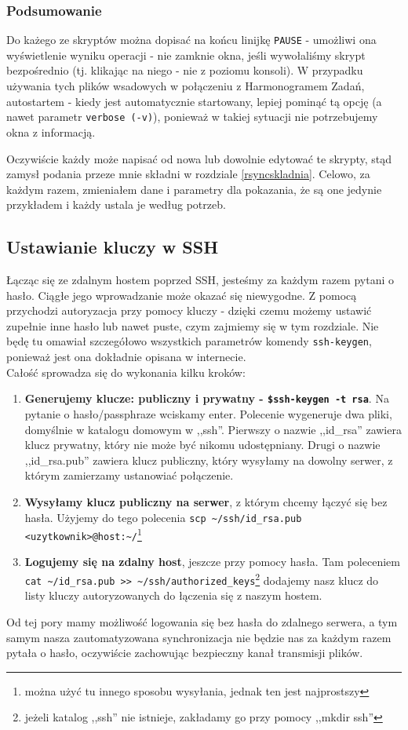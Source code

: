\subsubsection{Podsumowanie}
Do każego ze skryptów można dopisać na końcu linijkę \verb|PAUSE| - umożliwi ona wyświetlenie wyniku operacji - nie zamknie okna, jeśli wywołaliśmy skrypt bezpośrednio (tj. klikając na niego - nie z poziomu konsoli). W przypadku używania tych plików wsadowych w połączeniu z Harmonogramem Zadań, autostartem - kiedy jest automatycznie startowany, lepiej pominąć tą opcję (a nawet parametr \verb|verbose (-v)|), ponieważ w takiej sytuacji nie potrzebujemy okna z informacją. 

Oczywiście każdy może napisać od nowa lub dowolnie edytować te skrypty, stąd zamysł podania przeze mnie składni w rozdziale \ref{rsyncskladnia}. Celowo, za każdym razem, zmieniałem dane i parametry dla pokazania, że są one jedynie przykładem i każdy ustala je według potrzeb.

\subsection{Ustawianie kluczy w SSH}
Łącząc się ze zdalnym hostem poprzed SSH, jesteśmy za każdym razem pytani o hasło. Ciągłe jego wprowadzanie może okazać się niewygodne. Z pomocą przychodzi autoryzacja przy pomocy kluczy - dzięki czemu możemy ustawić zupełnie inne hasło lub nawet puste, czym zajmiemy się w tym rozdziale. Nie będę tu omawiał szczegółowo wszystkich parametrów komendy \verb|ssh-keygen|, ponieważ jest ona dokładnie opisana w internecie\cite{8}.
\\Całość sprowadza się do wykonania kilku kroków:
\begin{enumerate}
\item {\bf Generujemy klucze: publiczny i prywatny - \verb|$ssh-keygen -t rsa|}. Na pytanie o hasło/passphraze wciskamy enter. Polecenie wygeneruje dwa pliki, domyślnie w katalogu domowym w ,,ssh''. Pierwszy o nazwie ,,id\_rsa'' zawiera klucz prywatny, który nie może być nikomu udostępniany. Drugi o nazwie ,,id\_rsa.pub'' zawiera klucz publiczny, który wysyłamy na dowolny serwer, z którym zamierzamy ustanowiać połączenie.

\item {\bf Wysyłamy klucz publiczny na serwer}, z którym chcemy łączyć się bez hasła. Użyjemy do tego polecenia \verb|scp ~/ssh/id_rsa.pub <uzytkownik>@host:~/|\footnote{można użyć tu innego sposobu wysyłania, jednak ten jest najprostszy}

\item {\bf Logujemy się na zdalny host}, jeszcze przy pomocy hasła. Tam poleceniem \verb|cat ~/id_rsa.pub >> ~/ssh/authorized_keys|\footnote{jeżeli katalog ,,ssh'' nie istnieje, zakładamy go przy pomocy ,,mkdir ssh''} dodajemy nasz klucz do listy kluczy autoryzowanych do łączenia się z naszym hostem.
\end{enumerate}
Od tej pory mamy możliwość logowania się bez hasła do zdalnego serwera, a tym samym nasza zautomatyzowana synchronizacja nie będzie nas za każdym razem pytała o hasło, oczywiście zachowując bezpieczny kanał transmisji plików.

